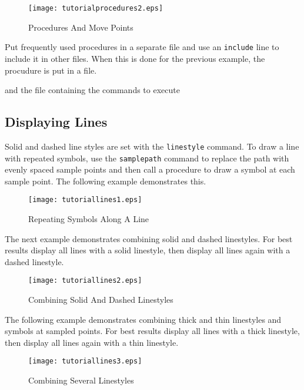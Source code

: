 \begin{figure}[htb]
\texttt{[image: tutorialprocedures2.eps]}
\caption{Procedures And Move Points}
\label{tutorialprocedures2}
\end{figure}


Put frequently used procedures in a separate file and use an
\texttt{include}
line to include it in other files.  When this is done for the
previous example, the procudure is put in a file.



and the file containing the commands to execute



\subsection{Displaying Lines}

Solid and dashed line styles are set with the
\texttt{linestyle} command.  To draw a line with repeated symbols, use the
\texttt{samplepath}
command to replace the path with evenly spaced sample points and
then call a procedure to draw a symbol at each sample point.
The following example demonstrates this.



\begin{figure}[htb]
\texttt{[image: tutoriallines1.eps]}
\caption{Repeating Symbols Along A Line}
\label{tutoriallines1}
\end{figure}

The next example demonstrates
combining solid and dashed linestyles.
For best results display all lines with a solid linestyle,
then display all lines again with a dashed linestyle.



\begin{figure}[htb]
\texttt{[image: tutoriallines2.eps]}
\caption{Combining Solid And Dashed Linestyles}
\label{tutoriallines2}
\end{figure}

The following example demonstrates combining thick and
thin linestyles and symbols at sampled points.
For best results display all lines with a thick linestyle,
then display all lines again with a thin linestyle.



\begin{figure}[htb]
\texttt{[image: tutoriallines3.eps]}
\caption{Combining Several Linestyles}
\label{tutoriallines3}
\end{figure}

